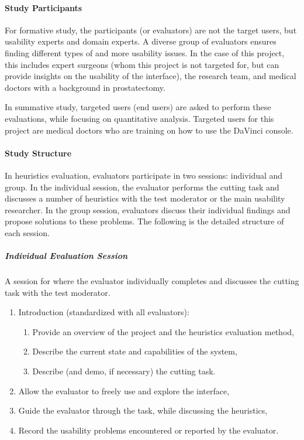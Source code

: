 \paragraph{Study Participants}
For formative study, the participants (or evaluators) are not the target users, but usability experts and domain experts. A diverse group of evaluators ensures finding different types of and more usability issues. In the case of this project, this includes expert surgeons (whom this project is not targeted for, but can provide insights on the usability of the interface), the research team, and medical doctors with a background in prostatectomy.

In summative study, targeted users (end users) are asked to perform these evaluations, while focusing on quantitative analysis. Targeted users for this project are medical doctors who are training on how to use the DaVinci console.

\paragraph{Study Structure}
In heuristics evaluation, evaluators participate in two sessions: individual and group. In the individual session, the evaluator performs the cutting task and discusses a number of heuristics with the test moderator or the main usability researcher. In the group session, evaluators discuss their individual findings and propose solutions to these problems. The following is the detailed structure of each session.

\subparagraph{Individual Evaluation Session} A session for where the evaluator individually completes and discusses the cutting task with the test moderator.
\begin{enumerate}[1.]
  \item Introduction (standardized with all evaluators):
  \begin{enumerate}[\em a\em)]
  \item Provide an overview of the project and the heuristics evaluation method,
  \item Describe the current state and capabilities of the system,
  \item Describe (and demo, if necessary) the cutting task.
  \end{enumerate}
  \item Allow the evaluator to freely use and explore the interface,
  \item Guide the evaluator through the task, while discussing the heuristics,
  \item Record the usability problems encountered or reported by the evaluator.
\end{enumerate}

